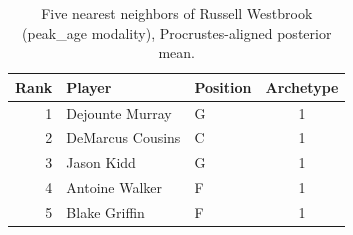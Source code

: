 \begin{table}[htbp]
  \centering\small
  \begin{tabular}{rllc}
    \toprule
    Rank & Player & Position & Archetype \\
    \midrule
    1 & Dejounte Murray & G & 1 \\
    2 & DeMarcus Cousins & C & 1 \\
    3 & Jason Kidd & G & 1 \\
    4 & Antoine Walker & F & 1 \\
    5 & Blake Griffin & F & 1 \\
    \bottomrule
  \end{tabular}
  \caption{Five nearest neighbors of Russell Westbrook (peak_age modality), Procrustes-aligned posterior mean.}
  \label{tab:Russell_Westbrook_neighbors_peak_age}
\end{table}


